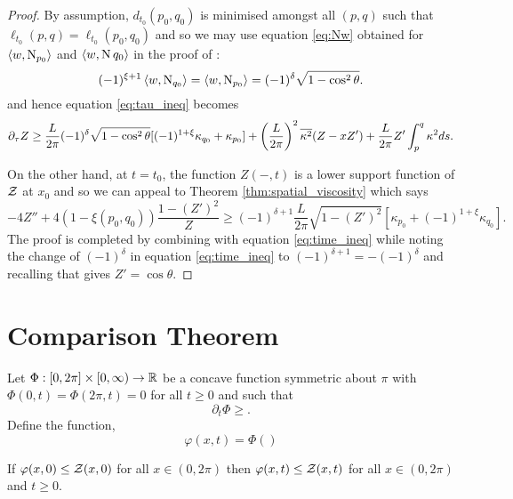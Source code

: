 \documentclass[a4paper, 12pt]{amsart}
\begin{document}
\begin{proof}
By assumption, \(d_{t_0} (p_0, q_0)\) is minimised amongst all \((p, q)\) such that \(\ell_{t_0}(p, q) = \ell_{t_0}(p_0, q_0)\) and so we may use equation \eqref{eq:Nw} obtained for $\left\langle w,\operatorname{N}_{p_0} \right\rangle$ and $\left\langle w,\operatorname{N}{q_0} \right\rangle$ in the proof of :
\[
(-1)^{\xi+1} \left\langle w,\operatorname{N}_{q_0} \right\rangle = \left\langle w,\operatorname{N}_{p_0} \right\rangle =  (-1)^\delta \sqrt{1-\cos^2\theta}.
\]
and hence equation \eqref{eq:tau_ineq} becomes
\begin{equation}
\label{eq:time_ineq}
\partial_{\tau} Z \geq \frac{L}{2\pi} (-1)^\delta \sqrt{1-\cos^2\theta} [(-1)^{1+\xi}\kappa_{q_0} + \kappa_{p_0}] + \left(\frac{L}{2\pi}\right)^2 \overline{{\kappa^2}} (Z - x Z') + \frac{L}{2\pi} Z' \int_p^q \kappa^2 ds.
\end{equation}

On the other hand, at $t=t_0$, the function $Z(-, t)$ is a lower support function of $\operatorname{\mathcal{Z}}$ at $x_0$ and so we can appeal to Theorem \ref{thm:spatial_viscosity} which says
\[
-4Z'' + 4(1-\xi(p_0,q_0)) \frac{1 - (Z')^2}{Z} \geq (-1)^{\delta+1} \frac{L}{2\pi} \sqrt{1 - (Z')^2} \left[\kappa_{p_0} + (-1)^{1+\xi} \kappa_{q_0}\right].
\]
The proof is completed by combining with equation \eqref{eq:time_ineq} while noting the change of \((-1)^{\delta}\) in equation \eqref{eq:time_ineq} to \((-1)^{\delta + 1} = -(-1)^{\delta}\) and recalling that  gives \(Z' = \cos\theta\).
\end{proof}

\section{Comparison Theorem}
\label{sec:comparison}

\begin{thm}
\label{thm:comparison}
Let \(\Phi : [0, 2\pi] \times [0, \infty) \to \mathbb{R}\) be a concave function symmetric about \(\pi\) with \(\Phi(0, t) = \Phi(2\pi, t) = 0\) for all \(t \geq 0\) and such that
\[
\partial_t \Phi \geq .
\]
Define the function,
\[
\varphi(x, t) = \Phi()
\]

If \(\varphi (x, 0) \leq \operatorname{\mathcal{Z}}(x, 0)\) for all \(x \in (0, 2\pi)\) then \(\varphi (x, t) \leq \operatorname{\mathcal{Z}}(x, t)\) for all \(x \in (0, 2\pi)\) and \(t \geq 0\).
\end{thm}
\end{document}
